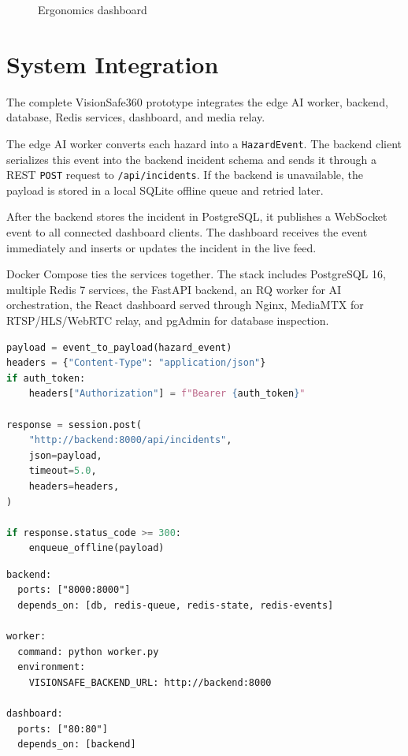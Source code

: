 \begin{figure}[H]
\centering
{}
\caption{Ergonomics dashboard}
\end{figure}

\section{System Integration}

The complete VisionSafe360 prototype integrates the edge AI worker, backend, database, Redis services, dashboard, and media relay.

The edge AI worker converts each hazard into a \texttt{HazardEvent}. The backend client serializes this event into the backend incident schema and sends it through a REST \texttt{POST} request to \texttt{/api/incidents}. If the backend is unavailable, the payload is stored in a local SQLite offline queue and retried later.

After the backend stores the incident in PostgreSQL, it publishes a WebSocket event to all connected dashboard clients. The dashboard receives the event immediately and inserts or updates the incident in the live feed.

Docker Compose ties the services together. The stack includes PostgreSQL 16, multiple Redis 7 services, the FastAPI backend, an RQ worker for AI orchestration, the React dashboard served through Nginx, MediaMTX for RTSP/HLS/WebRTC relay, and pgAdmin for database inspection.

\begin{lstlisting}[language=Python,caption={Edge AI event delivery to backend},label={lst:backend-client}]
payload = event_to_payload(hazard_event)
headers = {"Content-Type": "application/json"}
if auth_token:
    headers["Authorization"] = f"Bearer {auth_token}"

response = session.post(
    "http://backend:8000/api/incidents",
    json=payload,
    timeout=5.0,
    headers=headers,
)

if response.status_code >= 300:
    enqueue_offline(payload)
\end{lstlisting}

\begin{lstlisting}[language={},caption={Docker Compose service integration excerpt},label={lst:compose}]
backend:
  ports: ["8000:8000"]
  depends_on: [db, redis-queue, redis-state, redis-events]

worker:
  command: python worker.py
  environment:
    VISIONSAFE_BACKEND_URL: http://backend:8000

dashboard:
  ports: ["80:80"]
  depends_on: [backend]
\end{lstlisting}

